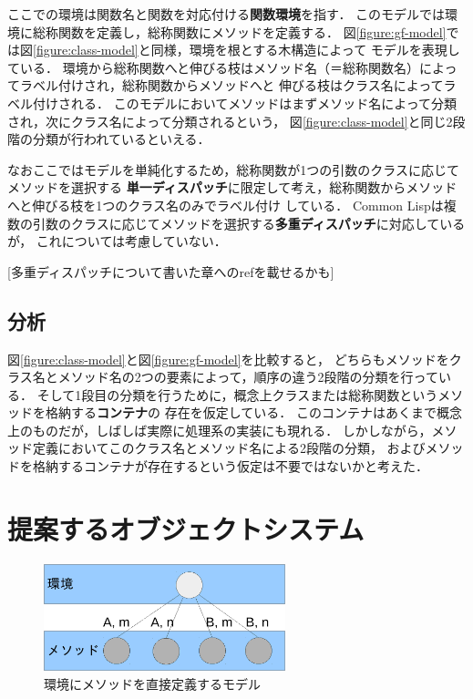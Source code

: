 \documentclass[a4paper,11pt,dvipdfmx]{jreport}
\begin{document}
ここでの環境は関数名と関数を対応付ける\textbf{関数環境}を指す．
このモデルでは環境に総称関数を定義し，総称関数にメソッドを定義する．
図\ref{figure:gf-model}では図\ref{figure:class-model}と同様，環境を根とする木構造によって
モデルを表現している．
環境から総称関数へと伸びる枝はメソッド名（＝総称関数名）によってラベル付けされ，総称関数からメソッドへと
伸びる枝はクラス名によってラベル付けされる．
このモデルにおいてメソッドはまずメソッド名によって分類され，次にクラス名によって分類されるという，
図\ref{figure:class-model}と同じ2段階の分類が行われているといえる．

なおここではモデルを単純化するため，総称関数が1つの引数のクラスに応じてメソッドを選択する
\textbf{単一ディスパッチ}に限定して考え，総称関数からメソッドへと伸びる枝を1つのクラス名のみでラベル付け
している．
Common Lispは複数の引数のクラスに応じてメソッドを選択する\textbf{多重ディスパッチ}に対応しているが，
これについては考慮していない．

[多重ディスパッチについて書いた章へのrefを載せるかも]

\section{分析}

図\ref{figure:class-model}と図\ref{figure:gf-model}を比較すると，
どちらもメソッドをクラス名とメソッド名の2つの要素によって，順序の違う2段階の分類を行っている．
そして1段目の分類を行うために，概念上クラスまたは総称関数というメソッドを格納する\textbf{コンテナ}の
存在を仮定している．
このコンテナはあくまで概念上のものだが，しばしば実際に処理系の実装にも現れる．
しかしながら，メソッド定義においてこのクラス名とメソッド名による2段階の分類，
およびメソッドを格納するコンテナが存在するという仮定は不要ではないかと考えた．


\chapter{提案するオブジェクトシステム}

\begin{figure}[htbp]
	\centering
	\includegraphics[width=7cm]{fig/trees_containerless-crop.pdf}
	\caption{環境にメソッドを直接定義するモデル}
	\label{figure:containerlsss-model}
\end{figure}
\end{document}

